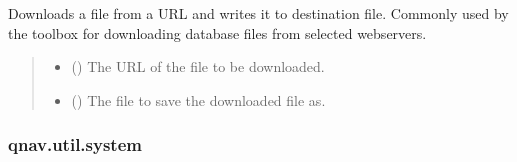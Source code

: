 \documentclass[letterpaper,10pt,english]{sphinxmanual}
\begin{document}
\begin{fulllineitems}
\label{\detokenize{modules/util/connections:qnav.util.connections.download_file}}
\pysigstartsignatures
{}
\pysigstopsignatures
\sphinxAtStartPar
Downloads a file from a URL and writes it to destination file.
Commonly used by the toolbox for downloading database files from
selected web\sphinxhyphen{}servers.
\begin{quote}\begin{description}
\begin{itemize}
\item {} 
\sphinxAtStartPar
{} () \textendash{} The URL of the file to be downloaded.

\item {} 
\sphinxAtStartPar
{} () \textendash{} The file to save the downloaded file as.

\end{itemize}

\end{description}\end{quote}

\end{fulllineitems}


\sphinxstepscope


\subsubsection{qnav.util.system}
\label{\detokenize{modules/util/system:module-qnav.util.system}}\label{\detokenize{modules/util/system:qnav-util-system}}\label{\detokenize{modules/util/system::doc}}
\end{document}
